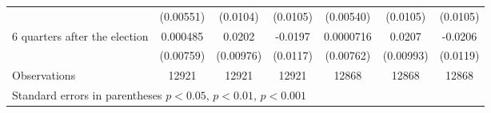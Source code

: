 \begin{table}[!ht]
\begin{tabular}{l*{6}{c}}
                    &   (0.00551)         &    (0.0104)         &    (0.0105)         &   (0.00540)         &    (0.0105)         &    (0.0105)         \\
[0,5em]
 6 quarters after the election&    0.000485         &      0.0202\sym{*}  &     -0.0197         &   0.0000716         &      0.0207\sym{*}  &     -0.0206         \\
                    &   (0.00759)         &   (0.00976)         &    (0.0117)         &   (0.00762)         &   (0.00993)         &    (0.0119)         \\
\hline
Observations        &       12921         &       12921         &       12921         &       12868         &       12868         &       12868         \\
\hline\hline
\multicolumn{7}{l}{\footnotesize Standard errors in parentheses \sym{*} \(p<0.05\), \sym{**} \(p<0.01\), \sym{***} \(p<0.001\)}\\
\end{tabular}
\end{table}

